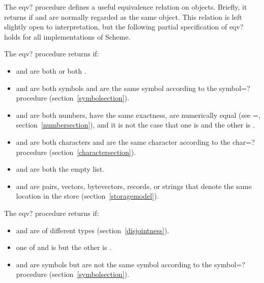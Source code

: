 \begin{entry}{%
}

The {\cf eqv?} procedure defines a useful equivalence relation on objects.
Briefly, it returns \schtrue{} if  and  are
normally regarded as the same object.  This relation is left slightly
open to interpretation, but the following partial specification of
{\cf eqv?} holds for all implementations of Scheme.

The {\cf eqv?} procedure returns \schtrue{} if:

\begin{itemize}
\item {} and  are both \schtrue{} or both \schfalse.

\item {} and  are both symbols and are the same
symbol according to the {\cf symbol=?} procedure
(section~\ref{symbolsection}).

\item {} and  are both numbers, 
have the same exactness,
are numerically equal (see {\cf =}, section~\ref{numbersection}),
and it is not the case that one is {} and the other is {}.

\item {} and  are both characters and are the same
character according to the {\cf char=?} procedure
(section~\ref{charactersection}).

\item {} and  are both the empty list.

\item {} and  are pairs, vectors, bytevectors, records,
or strings that denote the same location in the store
(section~\ref{storagemodel}).
\end{itemize}

The {\cf eqv?} procedure returns \schfalse{} if:

\begin{itemize}
\item {} and  are of different types
(section~\ref{disjointness}).

\item one of  and  is \schtrue{} but the other is
\schfalse{}.

\item {} and  are symbols but are not the same
symbol according to the {\cf symbol=?} procedure
(section~\ref{symbolsection}).


\end{itemize}
\end{entry}
